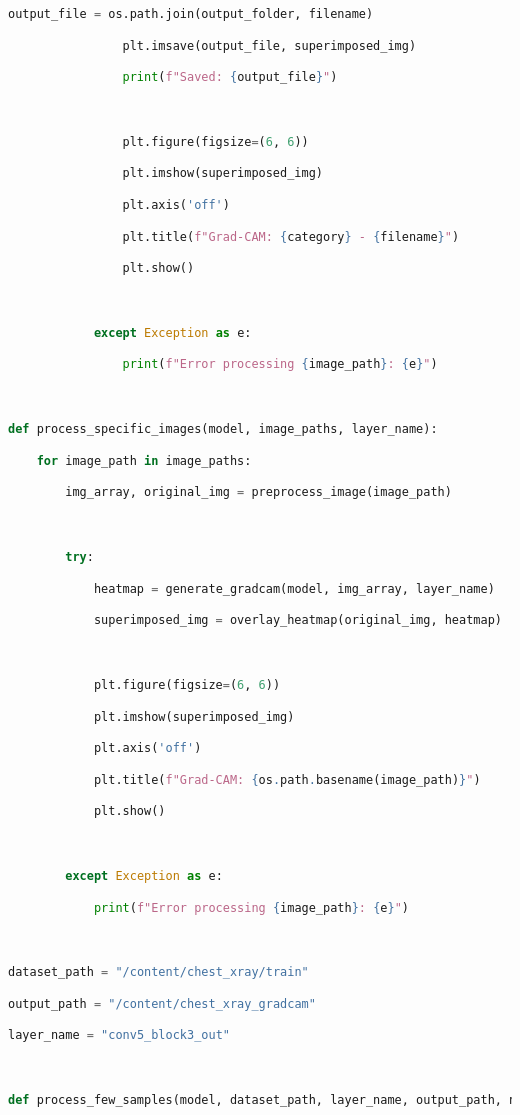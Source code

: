 \documentclass{article}
\begin{document}
\begin{lstlisting}[style=mystyle,language=Python]
                output_file = os.path.join(output_folder, filename)

                plt.imsave(output_file, superimposed_img)

                print(f"Saved: {output_file}")



                plt.figure(figsize=(6, 6))

                plt.imshow(superimposed_img)

                plt.axis('off')

                plt.title(f"Grad-CAM: {category} - {filename}")

                plt.show()



            except Exception as e:

                print(f"Error processing {image_path}: {e}")



def process_specific_images(model, image_paths, layer_name):

    for image_path in image_paths:

        img_array, original_img = preprocess_image(image_path)



        try:

            heatmap = generate_gradcam(model, img_array, layer_name)

            superimposed_img = overlay_heatmap(original_img, heatmap)



            plt.figure(figsize=(6, 6))

            plt.imshow(superimposed_img)

            plt.axis('off')

            plt.title(f"Grad-CAM: {os.path.basename(image_path)}")

            plt.show()



        except Exception as e:

            print(f"Error processing {image_path}: {e}")



dataset_path = "/content/chest_xray/train"

output_path = "/content/chest_xray_gradcam"

layer_name = "conv5_block3_out"



def process_few_samples(model, dataset_path, layer_name, output_path, num_samples=5):


\end{lstlisting}
\end{document}
